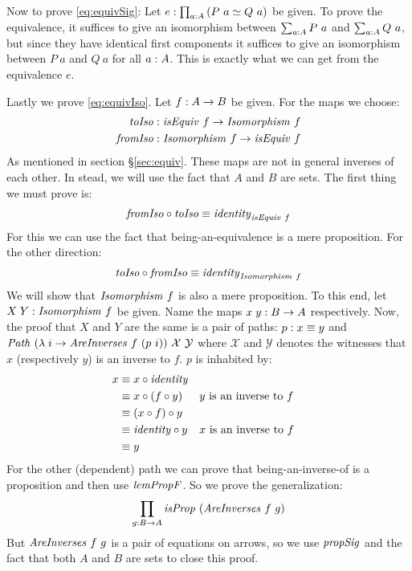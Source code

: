 Now to prove \ref{eq:equivSig}: Let $e \mathrel{:} \prod_{a \mathrel{:} A} \left( P\ a \simeq
Q\ a \right)$ be given. To prove the equivalence, it suffices to give an
isomorphism between $\sum_{a \tp A} P\ a$ and $\sum_{a \mathrel{:} A} Q\ a$, but since
they have identical first components it suffices to give an isomorphism between
$P\ a$ and $Q\ a$ for all $a \mathrel{:} A$. This is exactly what we can get from
the equivalence $e$.\QED

Lastly we prove \ref{eq:equivIso}. Let $f \mathrel{:} A \to B$ be given. For the maps we
choose:
%
\begin{align*}
\var{toIso}
  & \tp \isEquiv\ f             \to \Isomorphism\ f \\
\var{fromIso}
  & \tp \Isomorphism\ f \to \isEquiv\ f
\end{align*}
%
As mentioned in section \S\ref{sec:equiv}. These maps are not in general inverses
of each other. In stead, we will use the fact that $A$ and $B$ are sets. The first thing we must prove is:
%
\begin{align*}
  \var{fromIso} \comp \var{toIso} \equiv \identity_{\isEquiv\ f}
\end{align*}
%
For this we can use the fact that being-an-equivalence is a mere proposition.
For the other direction:
%
\begin{align*}
  \var{toIso} \comp \var{fromIso} \equiv \identity_{\Isomorphism\ f}
\end{align*}
%
We will show that $\Isomorphism\ f$ is also a mere proposition. To this
end, let $X\;Y \tp \Isomorphism\ f$ be given. Name the maps $x\;y \mathrel{:} B
\to A$ respectively. Now, the proof that $X$ and $Y$ are the same is a pair of
paths: $p \mathrel{:} x \equiv y$ and $\Path\ (\lambda\; i \to
\var{AreInverses}\ f\ (p\ i))\ \mathcal{X}\ \mathcal{Y}$ where $\mathcal{X}$
and $\mathcal{Y}$ denotes the witnesses that $x$ (respectively $y$) is an
inverse to $f$. $p$ is inhabited by:
%
\begin{align*}
  x
  & \equiv x \comp \identity \\
  & \equiv x \comp (f \comp y)
  && \text{$y$ is an inverse to $f$} \\
  & \equiv (x \comp f) \comp y \\
  & \equiv \identity \comp y
  && \text{$x$ is an inverse to $f$} \\
  & \equiv y
\end{align*}
%
For the other (dependent) path we can prove that being-an-inverse-of is a
proposition and then use $\lemPropF$. So we prove the generalization:
%
\begin{align}
\label{eq:propAreInversesGen}
\prod_{g \tp B \to A} \isProp\ (\var{AreInverses}\ f\ g)
\end{align}
%
But $\var{AreInverses}\ f\ g$ is a pair of equations on arrows, so we use
$\propSig$ and the fact that both $A$ and $B$ are sets to close this proof.

